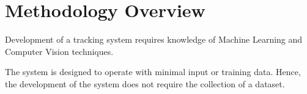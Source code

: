 \section{Methodology Overview}
  Development of a tracking system requires knowledge of Machine Learning and Computer Vision techniques.
  
  The system is designed to operate with minimal input or training data.
  Hence, the development of the system does not require the collection of a dataset.

